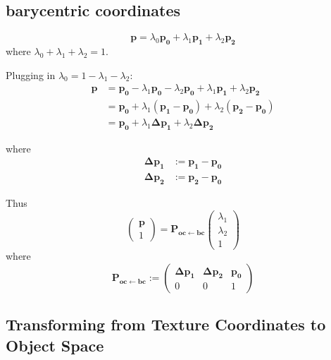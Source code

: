 \documentclass{article}
\newcommand{\point}[1]{\mathbf{#1}}
\newcommand{\mat}[1]{\mathbf{#1}}
\newcommand{\pMat}[2]{\mat{P_{#1 \leftarrow #2}}}
\newcommand{\colvec}[1]{\begin{pmatrix}#1\end{pmatrix}}
\begin{document}
\subsection{barycentric coordinates}

\[
\point{p} = \lambda_0 \point{p_0} + \lambda_1 \point{p_1} + \lambda_2 \point{p_2}
\]
where \(\lambda_0 + \lambda_1 + \lambda_2 = 1\).

Plugging in \(\lambda_0 = 1 - \lambda_1 - \lambda_2\):
\begin{align*}
\point{p} &= \point{p_0} - \lambda_1 \point{p_0} - \lambda_2 \point{p_0}  + \lambda_1 \point{p_1} + \lambda_2 \point{p_2} \\
&= \point{p_0}  + \lambda_1 (\point{p_1}-\point{p_0}) + \lambda_2 (\point{p_2} - \point{p_0})\\
&= \point{p_0} + \lambda_1 \point{\Delta p_1} + \lambda_2 \point{\Delta p_2}
\end{align*}

where
\begin{align*}
\point{\Delta p_1} &:= \point{p_1} - \point{p_0}\\
\point{\Delta p_2} &:= \point{p_2} - \point{p_0}
\end{align*}

Thus
\[
 \colvec{\point{p}\\1} = \pMat{oc}{bc} \colvec{\lambda_1 \\ \lambda_2 \\ 1}
\]
where
\begin{equation}
\label{eq:mat_oc_from_bc}
 \pMat{oc}{bc} := \begin{pmatrix} 
                  \point{\Delta p_1} & \point{\Delta p_2} & \point{p_0} \\
                  0 & 0 & 1
                 \end{pmatrix}
\end{equation}


\subsection{Transforming from Texture Coordinates to Object Space}
\end{document}
